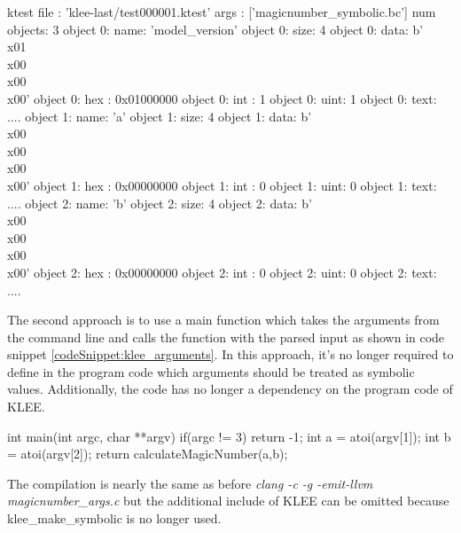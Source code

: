 \begin{customlisting}[caption={The test case generated by KLEE which triggers the assertion error when executing it on the code snippet \ref{codeSnippet:klee_inline}.}, label={listing:test_case_one}]
ktest file : 'klee-last/test000001.ktest'
args       : ['magicnumber_symbolic.bc']
num objects: 3
object 0: name: 'model_version'
object 0: size: 4
object 0: data: b'\\x01\\x00\\x00\\x00'
object 0: hex : 0x01000000
object 0: int : 1
object 0: uint: 1
object 0: text: ....
object 1: name: 'a'
object 1: size: 4
object 1: data: b'\\x00\\x00\\x00\\x00'
object 1: hex : 0x00000000
object 1: int : 0
object 1: uint: 0
object 1: text: ....
object 2: name: 'b'
object 2: size: 4
object 2: data: b'\\x00\\x00\\x00\\x00'
object 2: hex : 0x00000000
object 2: int : 0
object 2: uint: 0
object 2: text: ....
\end{customlisting}

The second approach is to use a main function which takes the arguments from the command line and calls the function with the parsed input as shown in code snippet \ref{codeSnippet:klee_arguments}.
In this approach, it's no longer required to define in the program code which arguments should be treated as symbolic values. Additionally, the code has no longer a dependency on the program code of KLEE.

\begin{codesnippet}[caption={Main function which parses two input arguments and calls the function calculateMagicNumber of code snippet \ref{codeSnippet:symbolicExecution}.}, label={codeSnippet:klee_arguments}]
int main(int argc, char **argv) {
  if(argc != 3){
	return -1;
  }
  int a = atoi(argv[1]);
  int b = atoi(argv[2]);
  return calculateMagicNumber(a,b);
}
\end{codesnippet}

The compilation is nearly the same as before \textit{clang -c -g -emit-llvm magicnumber\_args.c} but the additional include of KLEE can be omitted because klee\_make\_symbolic is no longer used.

